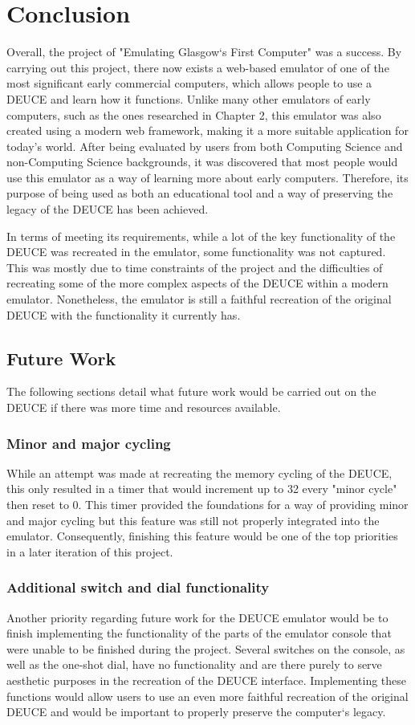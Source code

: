 \documentclass{l4proj}
\begin{document}
\chapter{Conclusion}    
Overall, the project of "Emulating Glasgow`s First Computer" was a success. By carrying out this project, there now exists a web-based emulator of one of the most significant early commercial computers, which allows people to use a DEUCE and learn how it functions. Unlike many other emulators of early computers, such as the ones researched in Chapter 2, this emulator was also created using a modern web framework, making it a more suitable application for today's world. After being evaluated by users from both Computing Science and non-Computing Science backgrounds, it was discovered that most people would use this emulator as a way of learning more about early computers. Therefore, its purpose of being used as both an educational tool and a way of preserving the legacy of the DEUCE has been achieved. 

In terms of meeting its requirements, while a lot of the key functionality of the DEUCE was recreated in the emulator, some functionality was not captured. This was mostly due to time constraints of the project and the difficulties of recreating some of the more complex aspects of the DEUCE within a modern emulator. Nonetheless, the emulator is still a faithful recreation of the original DEUCE with the functionality it currently has.

\section{Future Work}
The following sections detail what future work would be carried out on the DEUCE if there was more time and resources available.

\subsection{Minor and major cycling}
While an attempt was made at recreating the memory cycling of the DEUCE, this only resulted in a timer that would increment up to 32 every "minor cycle" then reset to 0. This timer provided the foundations for a way of providing minor and major cycling but this feature was still not properly integrated into the emulator. Consequently, finishing this feature would be one of the top priorities in a later iteration of this project.

\subsection{Additional switch and dial functionality}
Another priority regarding future work for the DEUCE emulator would be to finish implementing the functionality of the parts of the emulator console that were unable to be finished during the project. Several switches on the console, as well as the one-shot dial, have no functionality and are there purely to serve aesthetic purposes in the recreation of the DEUCE interface. Implementing these functions would allow users to use an even more faithful recreation of the original DEUCE and would be important to properly preserve the computer`s legacy.
\end{document}
